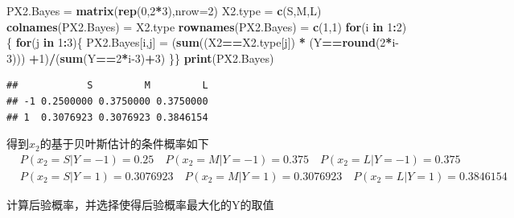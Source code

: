 \documentclass[
]{ctexart}
\newenvironment{Shaded}{\begin{snugshade}}{\end{snugshade}}
\newcommand{\AttributeTok}[1]{\textcolor[rgb]{0.13,0.29,0.53}{#1}}
\newcommand{\ControlFlowTok}[1]{\textcolor[rgb]{0.13,0.29,0.53}{\textbf{#1}}}
\newcommand{\DecValTok}[1]{\textcolor[rgb]{0.00,0.00,0.81}{#1}}
\newcommand{\FunctionTok}[1]{\textcolor[rgb]{0.13,0.29,0.53}{\textbf{#1}}}
\newcommand{\NormalTok}[1]{#1}
\newcommand{\OtherTok}[1]{\textcolor[rgb]{0.56,0.35,0.01}{#1}}
\newcommand{\SpecialCharTok}[1]{\textcolor[rgb]{0.81,0.36,0.00}{\textbf{#1}}}
\newcommand{\StringTok}[1]{\textcolor[rgb]{0.31,0.60,0.02}{#1}}
\begin{document}
\begin{Shaded}
\begin{Highlighting}[]
\NormalTok{PX2.Bayes }\OtherTok{=} \FunctionTok{matrix}\NormalTok{(}\FunctionTok{rep}\NormalTok{(}\DecValTok{0}\NormalTok{,}\DecValTok{2}\SpecialCharTok{*}\DecValTok{3}\NormalTok{),}\AttributeTok{nrow=}\DecValTok{2}\NormalTok{)}
\NormalTok{X2.type }\OtherTok{=} \FunctionTok{c}\NormalTok{(}\StringTok{\textquotesingle{}S\textquotesingle{}}\NormalTok{,}\StringTok{\textquotesingle{}M\textquotesingle{}}\NormalTok{,}\StringTok{\textquotesingle{}L\textquotesingle{}}\NormalTok{)}
\FunctionTok{colnames}\NormalTok{(PX2.Bayes) }\OtherTok{=}\NormalTok{ X2.type}
\FunctionTok{rownames}\NormalTok{(PX2.Bayes) }\OtherTok{=} \FunctionTok{c}\NormalTok{(}\StringTok{\textquotesingle{}{-}1\textquotesingle{}}\NormalTok{,}\StringTok{\textquotesingle{}1\textquotesingle{}}\NormalTok{)}
\ControlFlowTok{for}\NormalTok{(i }\ControlFlowTok{in} \DecValTok{1}\SpecialCharTok{:}\DecValTok{2}\NormalTok{)\{}
  \ControlFlowTok{for}\NormalTok{(j }\ControlFlowTok{in} \DecValTok{1}\SpecialCharTok{:}\DecValTok{3}\NormalTok{)\{}
\NormalTok{    PX2.Bayes[i,j] }\OtherTok{=}\NormalTok{ (}\FunctionTok{sum}\NormalTok{((X2}\SpecialCharTok{==}\NormalTok{X2.type[j]) }\SpecialCharTok{*}\NormalTok{ (Y}\SpecialCharTok{==}\FunctionTok{round}\NormalTok{(}\DecValTok{2}\SpecialCharTok{*}\NormalTok{i}\DecValTok{{-}3}\NormalTok{))) }\SpecialCharTok{+}\DecValTok{1}\NormalTok{)}\SpecialCharTok{/}\NormalTok{(}\FunctionTok{sum}\NormalTok{(Y}\SpecialCharTok{==}\DecValTok{2}\SpecialCharTok{*}\NormalTok{i}\DecValTok{{-}3}\NormalTok{)}\SpecialCharTok{+}\DecValTok{3}\NormalTok{)}
\NormalTok{  \}\}}
\FunctionTok{print}\NormalTok{(PX2.Bayes)}
\end{Highlighting}
\end{Shaded}

\begin{verbatim}
##            S         M         L
## -1 0.2500000 0.3750000 0.3750000
## 1  0.3076923 0.3076923 0.3846154
\end{verbatim}

得到\(x_2\)的基于贝叶斯估计的条件概率如下 \begin{align*}
& P(x_2 = S|Y=-1) = 0.25 \quad P(x_2 = M|Y=-1) = 0.375 \quad P(x_2 = L|Y=-1) = 0.375 \\
& P(x_2 = S|Y=1) = 0.3076923 \quad P(x_2 = M|Y=1) = 0.3076923 \quad P(x_2 = L|Y=1) = 0.3846154
\end{align*}

计算后验概率，并选择使得后验概率最大化的Y的取值
\end{document}
